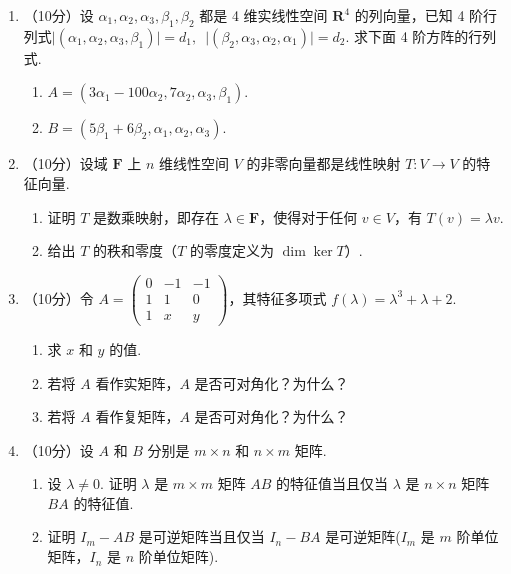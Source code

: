 \begin{enumerate}
\item （10分）设 $\alpha_1,\alpha_2,\alpha_3,\beta_1,\beta_2$ 都是 4 维实线性空间 $\mathbf{R}^4$ 的列向量，已知 4 阶行列式$\lvert (\alpha_1,\alpha_2,\alpha_3,\beta_1) \rvert=d_1,\enspace \lvert (\beta_2,\alpha_3,\alpha_2,\alpha_1) \rvert = d_2$.  求下面 4 阶方阵的行列式.
    \begin{enumerate}
        \item $A=(3\alpha_1-100\alpha_2,7\alpha_2,\alpha_3,\beta_1)$.

        \item $B=(5\beta_1+6\beta_2,\alpha_1,\alpha_2,\alpha_3)$.
    \end{enumerate}

\item （10分）设域 $\mathbf{F}$ 上 $n$ 维线性空间 $V$ 的非零向量都是线性映射 $T\colon V\to V$ 的特征向量.
    \begin{enumerate}
        \item 证明 $T$ 是数乘映射，即存在 $\lambda \in \mathbf{F}$，使得对于任何 $v \in V$，有 $T(v)=\lambda v$.

        \item 给出 $T$ 的秩和零度（$T$ 的零度定义为 $\dim \ker T$）.
    \end{enumerate}

\item （10分）令 $A=\begin{pmatrix}0 & -1 & -1 \\ 1 & 1 & 0 \\ 1 & x & y\end{pmatrix}$，其特征多项式 $f(\lambda) = \lambda^3+\lambda+2$.
    \begin{enumerate}
        \item 求 $x$ 和 $y$ 的值.

        \item 若将 $A$ 看作实矩阵，$A$ 是否可对角化？为什么？

        \item 若将 $A$ 看作复矩阵，$A$ 是否可对角化？为什么？
    \end{enumerate}

\item （10分）设 $A$ 和 $B$ 分别是 $m\times n$ 和 $n\times m$ 矩阵.
    \begin{enumerate}
        \item 设 $\lambda \neq 0$. 证明 $\lambda$ 是 $m\times m$ 矩阵 $AB$ 的特征值当且仅当 $\lambda$ 是 $n\times n$ 矩阵 $BA$ 的特征值.

        \item 证明 $I_m-AB$ 是可逆矩阵当且仅当 $I_n-BA$ 是可逆矩阵($I_m$ 是 $m$ 阶单位矩阵，$I_n$ 是 $n$ 阶单位矩阵).
    \end{enumerate}


\end{enumerate}
